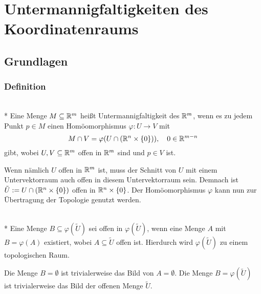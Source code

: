 
\chapter{Untermannigfaltigkeiten des Koordinatenraums}

\section{Grundlagen}
\subsection{Definition}

\begin{definition}\mbox{}\\*
Eine Menge $M\subseteq\mathbb R^m$ heißt
Untermannigfaltigkeit des $\mathbb R^m$, wenn es zu jedem Punkt $p\in M$ einen
Homöomorphismus $\varphi\colon U\to V$ mit%
\begin{equation}
M\cap V = \varphi(U\cap(\mathbb R^n\times\{0\})),\quad 0\in\mathbb R^{m-n}
\end{equation}
gibt, wobei $U,V\subseteq\mathbb R^m$ offen in $\mathbb R^m$ sind und $p\in V$ ist.
\end{definition}
Wenn nämlich $U$ offen in $\mathbb R^m$ ist, muss der Schnitt von $U$
mit einem Untervektorraum auch offen in diesem Untervektorraum
sein. Demnach ist $\tilde U:=U\cap(\mathbb R^n\times\{0\})$ offen in
$\mathbb R^n\times\{0\}$. Der Homöomorphismus $\varphi$ kann nun zur
Übertragung der Topologie genutzt werden. 

\begin{theorem}\mbox{}\\*
Eine Menge $B\subseteq\varphi(\tilde U)$
sei offen in $\varphi(\tilde U)$, wenn eine Menge $A$ mit
$B=\varphi(A)$ existiert, wobei
$A\subseteq\tilde U$ offen ist.
Hierdurch wird $\varphi(\tilde U)$
zu einem topologischen Raum.
\end{theorem}

\noindent{}
Die Menge $B=\emptyset$ ist trivialerweise das Bild von
$A=\emptyset$. Die Menge $B=\varphi(\tilde U)$ ist
trivialerweise das Bild der offenen Menge $\tilde U$.

